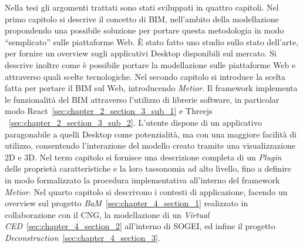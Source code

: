 Nella tesi gli argomenti trattati sono stati sviluppati in quattro capitoli.
Nel primo capitolo si descrive il concetto di BIM, nell’ambito della modellazione propondendo una possibile soluzione
per portare questa metodologia in modo ``semplicato'' sulle piattaforme Web.
\`E stato fatto uno studio sullo stato dell’arte, per fornire un overview
sugli applicativi Desktop disponibili sul mercato. Si descrive inoltre come è
possibile portare la modellazione sulle piattaforme Web e attraverso quali scelte tecnologiche.
Nel secondo capitolo si introduce la scelta fatta per portare il BIM sul Web, introducendo \emph{Metior}.
Il framework implementa le funzionalità del BIM attraverso l'utilizzo di librerie software,
in particolar modo React~\ref{sec:chapter_2_section_3_sub_1} e Threejs ~\ref{sec:chapter_2_section_3_sub_2}.
L'utente dispone di un applicativo paragonabile a quelli
Desktop come potenzialità, ma con una maggiore facilità di utilizzo, consentendo l'interazione del modello creato
tramite una visualizzazione 2D e 3D.
Nel terzo capitolo si fornisce una descrizione completa di un \emph{Plugin} delle
proprietà caratteristiche e la loro tassonomia ad alto livello, fino a definire in modo formalizzato
la procedura implementativa all'interno del framework \emph{Metior}.
Nel quarto capitolo si descrivono i contesti di applicazione, facendo un overview sul
progetto \emph{BaM}~\ref{sec:chapter_4_section_1} realizzato in collaborazione con il CNG,
la modellazione di un \emph{Virtual CED}~\ref{sec:chapter_4_section_2} all'interno di SOGEI, ed
infine il progetto \emph{Deconstruction}~\ref{sec:chapter_4_section_3}.
